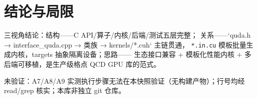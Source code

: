 \documentclass[UTF8]{ctexart}
\begin{document}
\section{结论与局限}
\begin{conclbox}
三视角结论：\textcolor{struct}{结构}——C API/算子/内核/后端/测试五层完整；
\textcolor{relation}{关系}——`quda.h → interface\_quda.cpp → 类族 → kernels/*.cuh` 主链贯通，
\texttt{*.in.cu} 模板批量生成内核，targets 抽象隔离设备；\textcolor{idea}{思路}——
生态接口兼容 + 模板化性能内核 + 多后端可移植，是生产级格点 QCD GPU 库的范式。
\end{conclbox}
\begin{warnbox}
\textcolor{warn}{未验证}：A7/A8/A9 实测执行步骤无法在本快照验证（无构建产物）；行号均经
read/grep 核实；本库非独立 git 仓库。
\end{warnbox}
\end{document}
